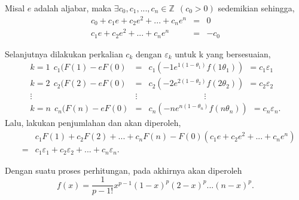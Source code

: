 \par 	Misal $e$ adalah aljabar, maka $\exists c_0,c_1,...,c_n \in \mathbb{Z}~~(c_0>0)$ sedemikian sehingga,
	$$\begin{array}{rcl}
	c_0+c_1e+c_2e^2+...+c_ne^n &=&0\\
	c_1e+c_2e^2+...+c_ne^n&=& -c_0
	\end{array}$$
\par 	Selanjutnya dilakukan perkalian $c_k$ dengan $\varepsilon_k$ untuk k yang bersesuaian,
	$$\begin{array}{rcl}
	k=1~~c_1(F(1) - eF(0) &=&  c_1(-1e^{1(1-\theta_1) }f(1\theta_1))~~=c_1\varepsilon_1 \\
	k=2~~c_2(F(2) - eF(0) &=&  c_2(-2e^{2(1-\theta_2) }f(2\theta_2))~~=c_2\varepsilon_2\\
	\vdots~~~~~~~~~~~~~~~~~~~~~~~~~~ &\vdots& ~~~~~~~~~~~~~~~~~~~~~~~~~~~~~~\vdots\\
	k=n~~c_n(F(n) - eF(0) &=&  c_n(-ne^{n(1-\theta_n) }f(n\theta_n))~~=c_n\varepsilon_n.
	\end{array}$$
	Lalu, lakukan penjumlahan dan akan diperoleh,
	$$\begin{array}{rcl}
	&~~& c_1F(1) +c_2F(2) +...+c_nF(n) - F(0)(c_1e+c_2e^2+...+c_ne^n)\\
	&=& c_1\varepsilon_1+c_2\varepsilon_2+...+c_n\varepsilon_n.
	\end{array}$$
\par 	Dengan suatu proses perhitungan, pada akhirnya akan diperoleh
	$$f(x) = \frac{1}{p-1!}x^{p-1}(1-x)^p(2-x)^p...(n-x)^p.$$